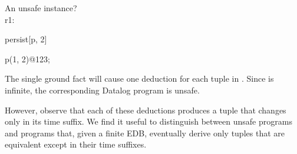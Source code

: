 

\begin{example}
\label{ex:tempsafe}
%
An unsafe \slang instance?
\\
r1:
\begin{Dedalus}
persist[p, 2]

p(1, 2)@123;
\end{Dedalus}


The single ground fact will cause one deduction for each tuple in
.  Since  is infinite, the corresponding
Datalog
program is unsafe.  
%
\end{example}

However, observe that each of these deductions produces a tuple that changes
only in its time suffix.  We find it useful to distinguish between unsafe
programs and programs that, given a finite EDB, eventually derive only tuples
that are equivalent except in their time suffixes.




